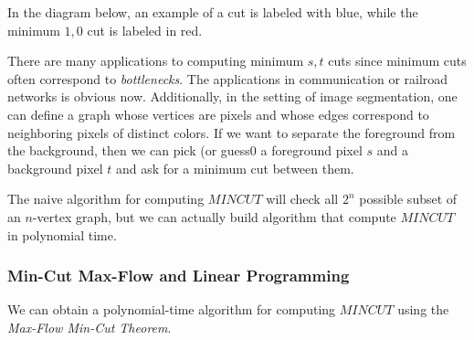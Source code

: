 \documentclass{article}
\begin{document}
  In the diagram below, an example of a cut is labeled with blue, while the minimum $1, 0$ cut is labeled in red. 
  \begin{center}
  \end{center}

  There are many applications to computing minimum $s, t$ cuts since minimum cuts often correspond to \textit{bottlenecks}. The applications in communication or railroad networks is obvious now. Additionally, in the setting of image segmentation, one can define a graph whose vertices are pixels and whose edges correspond to neighboring pixels of distinct colors. If we want to separate the foreground from the background, then we can pick (or guess0 a foreground pixel $s$ and a background pixel $t$ and ask for a minimum cut between them. 

  The naive algorithm for computing $MINCUT$ will check all $2^n$ possible subset of an $n$-vertex graph, but we can actually build algorithm that compute $MINCUT$ in polynomial time. 

  \subsubsection{Min-Cut Max-Flow and Linear Programming}
  We can obtain a polynomial-time algorithm for computing $MINCUT$ using the \textit{Max-Flow Min-Cut Theorem}. 
\end{document}
